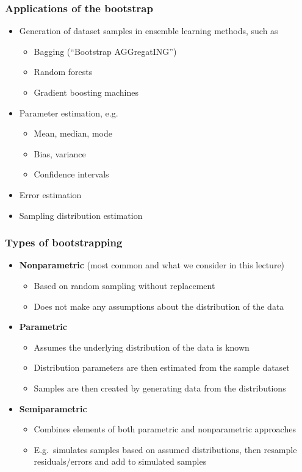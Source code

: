\documentclass[smaller]{beamer}
\newcommand{\?}{\stackrel{?}{=}}
\begin{document}
\begin{frame}
  \frametitle{Applications of the bootstrap}
  \label{applications}
  \pause
  \begin{itemize}
  \item Generation of dataset samples in ensemble learning methods, such as \pause
    \begin{itemize}
    \item Bagging (``Bootstrap AGGregatING'')\pause
    \item Random forests\pause
    \item Gradient boosting machines\pause
    \end{itemize}
  \item Parameter estimation, e.g.\pause
    \begin{itemize}
    \item Mean, median, mode\pause
    \item Bias, variance\pause
    \item Confidence intervals\pause      
    \end{itemize}
  \item Error estimation\pause
  \item Sampling distribution estimation%
  \end{itemize}
\end{frame}

\begin{frame}
  \frametitle{Types of bootstrapping}
  \pause
  \begin{itemize}
  \item \textbf{Nonparametric} (most common and what we consider in this lecture) \pause
    \begin{itemize}
    \item Based on random sampling without replacement\pause
    \item Does not make any assumptions about the distribution of the data\pause
    \end{itemize}
  \item \textbf{Parametric}\pause
    \begin{itemize}
    \item Assumes the underlying distribution of the data is known\pause
    \item Distribution parameters are then estimated from the sample dataset\pause
    \item Samples are then created by generating data from the distributions\pause
    \end{itemize}
  \item \textbf{Semiparametric}\pause
    \begin{itemize}
    \item Combines elements of both parametric and nonparametric approaches\pause
    \item E.g.\ simulates samples based on assumed distributions, then resample residuals/errors and add to simulated
      samples
    \end{itemize}    
  \end{itemize}
\end{frame}
\end{document}
